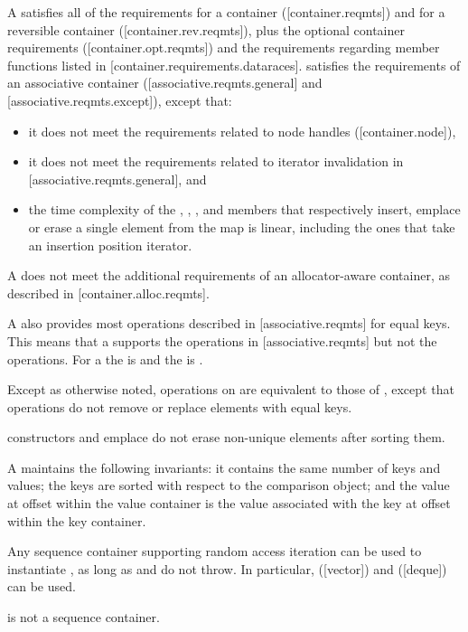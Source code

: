 \begin{addedblock}
\pnum
A  satisfies all of the requirements for a container
([container.reqmts]) and for a reversible container ([container.rev.reqmts]),
plus the optional container requirements ([container.opt.reqmts]) and the
requirements regarding  member functions listed in
[container.requirements.dataraces].   satisfies the
requirements of an associative container ([associative.reqmts.general] and
[associative.reqmts.except]), except that:
\begin{itemize}
\item it does not meet the requirements related to node handles ([container.node]),
\item it does not meet the requirements related to iterator invalidation in [associative.reqmts.general], and
\item the time complexity of the , , ,
and  members that respectively insert, emplace or erase a single
element from the map is linear, including the ones that take an insertion
position iterator.
\end{itemize}
A  does not meet the additional requirements of an
allocator-aware container, as described in [container.alloc.reqmts].

\pnum
A  also provides most operations described
in [associative.reqmts] for equal keys.  This means that a
 supports the  operations
in [associative.reqmts] but not the  operations.  For
a  the  is  and the
 is .

\pnum
Except as otherwise noted, operations on  are equivalent
to those of , except that  operations do
not remove or replace elements with equal keys.  \begin{example}
constructors and emplace do not erase non-unique elements after sorting them.\end{example}

\pnum
A  maintains the following invariants: it contains the
same number of keys and values; the keys are sorted with respect to the
comparison object; and the value at offset  within the value
container is the value associated with the key at offset  within the
key container.

\pnum
Any sequence container  supporting random access iteration can be
used to instantiate , as long as 
and  do not throw. In particular, 
([vector]) and  ([deque]) can be
used.  \begin{note} is not a sequence container.\end{note}


\end{addedblock}
